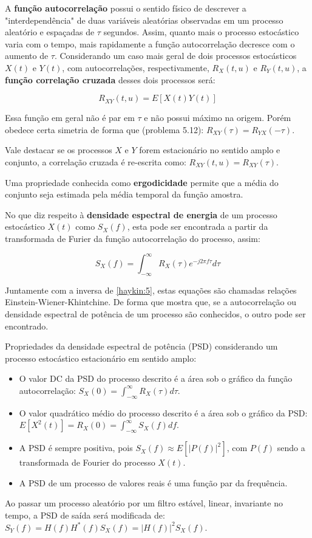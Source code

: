 A \textbf{função autocorrelação} possui o sentido físico de descrever a "interdependência" de duas variáveis aleatórias observadas em um processo aleatório e espaçadas de $\tau$ segundos. Assim, quanto mais o processo estocástico varia com o tempo, mais rapidamente a função autocorrelação decresce com o aumento de $\tau$. 
Considerando um caso mais geral de dois processos estocásticos $X(t)$ e $Y(t)$, com autocorrelações, respectivamente, $R_X(t,u)$ e $R_Y(t,u)$, a \textbf{função correlação cruzada} desses dois processos será:

\begin{equation} \label{haykin:4}
R_{XY}(t,u) = E[X(t)Y(t)]
\end{equation}

Essa função em geral não é par em $\tau$ e não possui máximo na origem. Porém obedece certa simetria de forma que (problema 5.12): $R_{XY}(\tau) = R_{YX}(-\tau)$.

Vale destacar se os processos $X$ e $Y$ forem estacionário no sentido amplo e conjunto, a correlação cruzada é re-escrita como: $R_{XY}(t,u)=R_{XY}(\tau)$.

Uma propriedade conhecida como \textbf{ergodicidade} permite que a média do conjunto seja estimada pela média temporal da função amostra.

No que diz respeito à \textbf{densidade espectral de energia} de um processo estocástico $X(t)$ como $S_X(f)$, esta pode ser encontrada a partir da transformada de Furier da função autocorrelação do processo, assim:

\begin{equation} \label{haykin:5}
S_X(f) = \int_{-\infty}^{\infty} R_X(\tau)e^{-j2\pi f \tau} d\tau
\end{equation}

Juntamente com a inversa de \ref{haykin:5}, estas equações são chamadas relações Einstein-Wiener-Khintchine. De forma que mostra que, se a autocorrelação ou densidade espectral de potência de um processo são conhecidos, o outro pode ser encontrado.

Propriedades da densidade espectral de potência (PSD) considerando um processo estocástico estacionário em sentido amplo:

\begin{itemize}
    \item O valor DC da PSD do processo descrito é a área sob o gráfico da função autocorrelação: $S_X(0) = \int_{-\infty}^{\infty} R_X(\tau)d\tau$.
    \item O valor quadrático médio do processo descrito é a área sob o gráfico da PSD: $E[X^2(t)] = R_X(0) = \int_{-\infty}^{\infty} S_X(f)df$.
    \item A PSD é sempre positiva, pois $S_X(f) \approx E[|P(f)|^2]$, com $P(f)$ sendo a transformada de Fourier do processo $X(t)$.
    \item A PSD de um processo de valores reais é uma função par da frequência.
\end{itemize}

Ao passar um processo aleatório por um filtro estável, linear, invariante no tempo, a PSD de saída será modificada de: $S_Y(f) = H(f)H^*(f)S_X(f) = |H(f)|^2S_X(f)$.